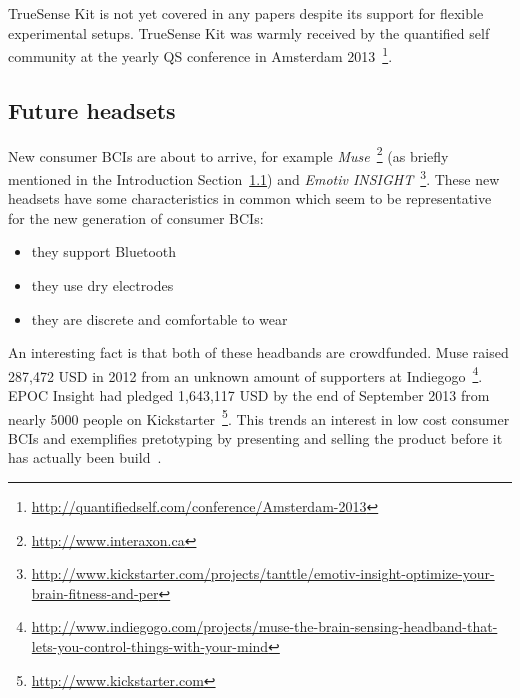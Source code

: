 \documentclass[a4paper,10pt,english,lof,lot,twoside]{puthesis}
\begin{document}
TrueSense Kit is not yet covered in any papers despite its support for flexible
experimental setups. TrueSense Kit was warmly received by the quantified self
community at the yearly QS conference in Amsterdam 2013 \footnote{
\href{http://quantifiedself.com/conference/Amsterdam-2013}{http://quantifiedself.com/conference/Amsterdam-2013}
}.


\subsection{Future headsets}
\label{ch-background/index:ch-background-future-headsets}\label{ch-background/index:future-headsets}
New consumer BCIs are about to arrive, for example \emph{Muse} \footnote{
\href{http://www.interaxon.ca}{http://www.interaxon.ca}
} (as briefly mentioned in the Introduction Section {\hyperref[ch-intro/index:ch-intro-neurofeedback-stress-and-bci]{1.1}}) and \emph{Emotiv INSIGHT} \footnote{
\href{http://www.kickstarter.com/projects/tanttle/emotiv-insight-optimize-your-brain-fitness-and-per}{http://www.kickstarter.com/projects/tanttle/emotiv-insight-optimize-your-brain-fitness-and-per}
}. These new headsets have some characteristics in
common which seem to be representative for the new generation of consumer BCIs:
\begin{itemize}
\item {} 
they support Bluetooth

\item {} 
they use dry electrodes

\item {} 
they are discrete and comfortable to wear

\end{itemize}

An interesting fact is that both of these headbands are
crowdfunded. Muse raised 287,472 USD in 2012 from an unknown amount of
supporters at Indiegogo \footnote{
\href{http://www.indiegogo.com/projects/muse-the-brain-sensing-headband-that-lets-you-control-things-with-your-mind}{http://www.indiegogo.com/projects/muse-the-brain-sensing-headband-that-lets-you-control-things-with-your-mind}
}. EPOC Insight had
pledged 1,643,117 USD by the end of September 2013 from nearly 5000 people on
Kickstarter \footnote{
\href{http://www.kickstarter.com}{http://www.kickstarter.com}
}. This trends an interest in
low cost consumer BCIs and exemplifies pretotyping by presenting and selling the
product before it has actually been build \cite{jeremy_pretotypingwork_2012}.
\end{document}
